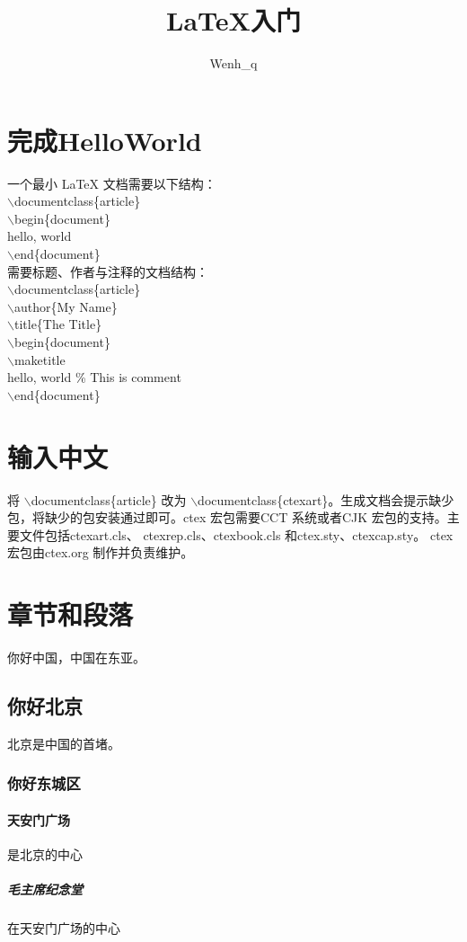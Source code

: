 \documentclass{ctexart}
\title{LaTeX入门}
\author{Wenh\_q}
\begin{document}
    \maketitle
    
    \section{完成HelloWorld}
一个最小 LaTeX 文档需要以下结构：\\
$\backslash$documentclass\{article\}\\
$\backslash$begin\{document\}\\
hello, world\\
$\backslash$end\{document\}\\

需要标题、作者与注释的文档结构：\\
$\backslash$documentclass\{article\}\\
$\backslash$author\{My Name\}\\
$\backslash$title\{The Title\}\\
$\backslash$begin\{document\}\\
$\backslash$maketitle\\
hello, world \% This is comment\\
$\backslash$end\{document\}\\

    \section{输入中文}
将 $\backslash$documentclass\{article\} 改为 $\backslash$documentclass\{ctexart\}。生成文档会提示缺少包，将缺少的包安装通过即可。ctex 宏包需要CCT 系统或者CJK 宏包的支持。主要文件包括ctexart.cls、 ctexrep.cls、ctexbook.cls 和ctex.sty、ctexcap.sty。 ctex 宏包由ctex.org 制作并负责维护。

    \section{章节和段落}
你好中国，中国在东亚。
        \subsection{你好北京}
北京是中国的首堵。
                \subsubsection{你好东城区}
                \paragraph{天安门广场}是北京的中心
                    \subparagraph{毛主席纪念堂}在天安门广场的中心
\end{document}
